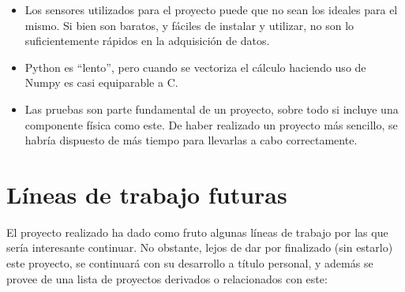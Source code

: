 \begin{itemize}
\item Los sensores utilizados para el proyecto puede que no sean los ideales para el mismo. Si bien son baratos, y fáciles de instalar y utilizar, no son lo suficientemente rápidos en la adquisición de datos. 
\item Python es ``lento'', pero cuando se vectoriza el cálculo haciendo uso de Numpy es casi equiparable a C.
\item Las pruebas son parte fundamental de un proyecto, sobre todo si incluye una componente física como este. De haber realizado un proyecto más sencillo, se habría dispuesto de más tiempo para llevarlas a cabo correctamente. 
\end{itemize}

\section{Líneas de trabajo futuras}

El proyecto realizado ha dado como fruto algunas líneas de trabajo por las que sería interesante continuar. No obstante, lejos de dar por finalizado (sin estarlo) este proyecto, se continuará con su desarrollo a título personal, y además se provee de una lista de proyectos derivados o relacionados con este: 

